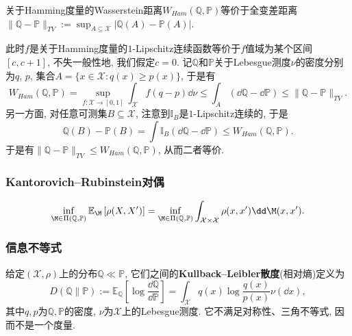 \begin{example}[Hamming度量和全变差距离]
	关于Hamming度量的Wasserstein距离$W_{Ham}(\mathbb{Q}, \mathbb{P})$等价于全变差距离$\|\mathbb{Q} - \mathbb{P}\|_{TV} := \sup_{A \subseteq \mathcal{X}} |\mathbb{Q}(A) - \mathbb{P}(A)|$. 
	
	此时$f$是关于Hamming度量的$1$-Lipschitz连续函数等价于$f$值域为某个区间$[c, c+1]$, 不失一般性地, 我们假定$c = 0$. 
	记$\mathbb{Q}$和$\mathbb{P}$关于Lebesgue测度$\nu$的密度分别为$q$, $p$, 集合$A = \{x \in \mathcal{X} \colon q(x) \geq p(x)\} $, 于是有
	\begin{equation*}
		W_{Ham}(\mathbb{Q}, \mathbb{P})
		= \sup_{f \colon \mathcal{X} \to [0, 1]} \int_{\mathcal{X}} f (q - p) \dd \nu 
		\leq \int_A (\dd \mathbb{Q} - \dd \mathbb{P})
		\leq \|\mathbb{Q} - \mathbb{P}\|_{TV}. 
	\end{equation*}
	另一方面, 对任意可测集$B \subseteq \mathcal{X}$, 注意到$\mathbb{I}_B$是$1$-Lipschitz连续的, 于是
	\begin{equation*}
		\mathbb{Q}(B) - \mathbb{P}(B) 
		= \int \mathbb{I}_B (\dd \mathbb{Q} - \dd \mathbb{P}) 
		\leq W_{Ham}(\mathbb{Q}, \mathbb{P}). 
	\end{equation*}
	于是有$\|\mathbb{Q} - \mathbb{P}\|_{TV} \leq W_{Ham}(\mathbb{Q}, \mathbb{P})$, 从而二者等价. 
\end{example}

\subsubsection{Kantorovich–Rubinstein对偶}

\begin{equation*}
	\inf_{\M \in \Pi(\mathbb{Q}, \mathbb{P})} \mathbb{E}_{\M} \left[ \rho(X, X') \right]
	= \inf_{\M \in \Pi(\mathbb{Q}, \mathbb{P})} \int_{\mathcal{X} \times \mathcal{X}} \rho(x, x') \dd \M(x, x'). 
\end{equation*}

\subsubsection{信息不等式}

给定$(\mathcal{X}, \rho)$上的分布$\mathbb{Q} \ll \mathbb{P}$, 它们之间的\textbf{Kullback–Leibler散度}(相对熵)定义为
\begin{equation}
	D(\mathbb{Q} \| \mathbb{P})
	:= \mathbb{E}_{\mathbb{Q}} \left[ \log \frac{\dd \mathbb{Q}}{\dd \mathbb{P}} \right]
	= \int_{\mathcal{X}} q(x) \log \frac{q(x)}{p(x)} \nu(\dd x), 
\end{equation}
其中$q, p$为$\mathbb{Q}, \mathbb{P}$的密度, $\nu$为$\mathcal{X}$上的Lebesgue测度. 
它不满足对称性、三角不等式, 因而不是一个度量. 
 
